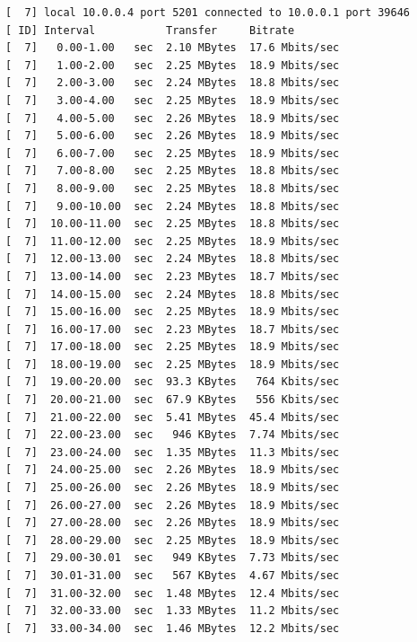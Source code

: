 \documentclass[12pt]{article}
\begin{document}
\begin{enumerate}
	\begin{latin}
		\begin{Verbatim}
[  7] local 10.0.0.4 port 5201 connected to 10.0.0.1 port 39646
[ ID] Interval           Transfer     Bitrate
[  7]   0.00-1.00   sec  2.10 MBytes  17.6 Mbits/sec                  
[  7]   1.00-2.00   sec  2.25 MBytes  18.9 Mbits/sec                  
[  7]   2.00-3.00   sec  2.24 MBytes  18.8 Mbits/sec                  
[  7]   3.00-4.00   sec  2.25 MBytes  18.9 Mbits/sec                  
[  7]   4.00-5.00   sec  2.26 MBytes  18.9 Mbits/sec                  
[  7]   5.00-6.00   sec  2.26 MBytes  18.9 Mbits/sec                  
[  7]   6.00-7.00   sec  2.25 MBytes  18.9 Mbits/sec                  
[  7]   7.00-8.00   sec  2.25 MBytes  18.8 Mbits/sec                  
[  7]   8.00-9.00   sec  2.25 MBytes  18.8 Mbits/sec                  
[  7]   9.00-10.00  sec  2.24 MBytes  18.8 Mbits/sec                  
[  7]  10.00-11.00  sec  2.25 MBytes  18.8 Mbits/sec                  
[  7]  11.00-12.00  sec  2.25 MBytes  18.9 Mbits/sec                  
[  7]  12.00-13.00  sec  2.24 MBytes  18.8 Mbits/sec                  
[  7]  13.00-14.00  sec  2.23 MBytes  18.7 Mbits/sec                  
[  7]  14.00-15.00  sec  2.24 MBytes  18.8 Mbits/sec                  
[  7]  15.00-16.00  sec  2.25 MBytes  18.9 Mbits/sec                  
[  7]  16.00-17.00  sec  2.23 MBytes  18.7 Mbits/sec                  
[  7]  17.00-18.00  sec  2.25 MBytes  18.9 Mbits/sec                  
[  7]  18.00-19.00  sec  2.25 MBytes  18.9 Mbits/sec                  
[  7]  19.00-20.00  sec  93.3 KBytes   764 Kbits/sec                  
[  7]  20.00-21.00  sec  67.9 KBytes   556 Kbits/sec                  
[  7]  21.00-22.00  sec  5.41 MBytes  45.4 Mbits/sec                  
[  7]  22.00-23.00  sec   946 KBytes  7.74 Mbits/sec                  
[  7]  23.00-24.00  sec  1.35 MBytes  11.3 Mbits/sec                  
[  7]  24.00-25.00  sec  2.26 MBytes  18.9 Mbits/sec                  
[  7]  25.00-26.00  sec  2.26 MBytes  18.9 Mbits/sec                  
[  7]  26.00-27.00  sec  2.26 MBytes  18.9 Mbits/sec                  
[  7]  27.00-28.00  sec  2.26 MBytes  18.9 Mbits/sec                  
[  7]  28.00-29.00  sec  2.25 MBytes  18.9 Mbits/sec                  
[  7]  29.00-30.01  sec   949 KBytes  7.73 Mbits/sec                  
[  7]  30.01-31.00  sec   567 KBytes  4.67 Mbits/sec                  
[  7]  31.00-32.00  sec  1.48 MBytes  12.4 Mbits/sec                  
[  7]  32.00-33.00  sec  1.33 MBytes  11.2 Mbits/sec                  
[  7]  33.00-34.00  sec  1.46 MBytes  12.2 Mbits/sec                  

\end{Verbatim}
\end{latin}
\end{enumerate}
\end{document}
